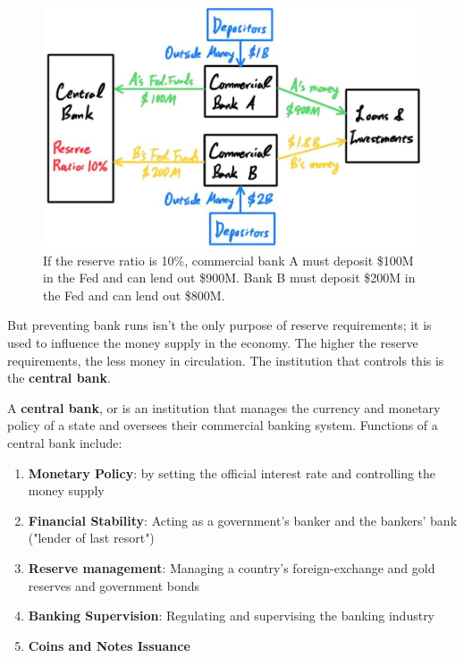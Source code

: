 \documentclass{article}
\begin{document}
  
    \begin{figure}[H]
      \centering 
      \includegraphics[scale=0.3]{img/Fed_Funds_Rate.jpg}
      \caption{If the reserve ratio is 10\%, commercial bank A must deposit \$100M in the Fed and can lend out \$900M. Bank B must deposit \$200M in the Fed and can lend out \$800M. } 
      \label{fig:Fed_Funds_Rate}
    \end{figure}

    But preventing bank runs isn't the only purpose of reserve requirements; it is used to influence the money supply in the economy. The higher the reserve requirements, the less money in circulation. The institution that controls this is the \textbf{central bank}. 

    \begin{definition}
      A \textbf{central bank}, or  is an institution that manages the currency and monetary policy of a state and oversees their commercial banking system. Functions of a central bank include: 
      \begin{enumerate}
        \item \textbf{Monetary Policy}: by setting the official interest rate and controlling the money supply 
        \item \textbf{Financial Stability}: Acting as a government's banker and the bankers' bank ("lender of last resort") 
        \item \textbf{Reserve management}: Managing a country's foreign-exchange and gold reserves and government bonds
        \item \textbf{Banking Supervision}: Regulating and supervising the banking industry
        \item \textbf{Coins and Notes Issuance}
      \end{enumerate}
    \end{definition}
\end{document}
